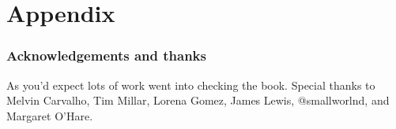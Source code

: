 \documentclass[
	10pt, %
	fleqn, %
	a5paper, %
]{LegrandOrangeBook}
\begin{document}
%
%
\stopcontents[part] %

\part{Appendix}
\section{Acknowledgements and thanks}
As you'd expect lots of work went into checking the book. Special thanks to Melvin Carvalho, Tim Millar, Lorena Gomez, James Lewis, @smallworlnd, and Margaret O'Hare.
\end{document}

